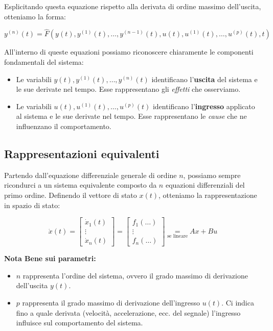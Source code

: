 \documentclass[a4paper,12pt]{article}
\begin{document}
	Esplicitando questa equazione rispetto alla derivata di ordine massimo dell'uscita, otteniamo la forma:
	
	\[
	y^{(n)}(t) = \hat{F}(y(t), y^{(1)}(t), \dots, y^{(n-1)}(t), u(t), u^{(1)}(t), \dots, u^{(p)}(t), t)
	\]
	
	All'interno di queste equazioni possiamo riconoscere chiaramente le componenti fondamentali del sistema:
	\begin{itemize}
		\item Le variabili $y(t), y^{(1)}(t), \dots, y^{(n)}(t)$ identificano l'\textbf{uscita} del sistema e le sue derivate nel tempo. Esse rappresentano gli \textit{effetti} che osserviamo.
		\item Le variabili $u(t), u^{(1)}(t), \dots, u^{(p)}(t)$ identificano l'\textbf{ingresso} applicato al sistema e le sue derivate nel tempo. Esse rappresentano le \textit{cause} che ne influenzano il comportamento.
	\end{itemize}
	\subsection{Rappresentazioni equivalenti}
	
	Partendo dall'equazione differenziale generale di ordine $n$, possiamo sempre ricondurci a un sistema equivalente composto da $n$ equazioni differenziali del primo ordine. Definendo il vettore di stato $x(t)$, otteniamo la rappresentazione in spazio di stato:
	
	\[
	\dot{x}(t) = 
	\begin{bmatrix} 
		\dot{x}_1(t) \\ 
		\vdots \\ 
		\dot{x}_n(t) 
	\end{bmatrix} 
	= 
	\begin{bmatrix} 
		f_1(\dots) \\ 
		\vdots \\ 
		f_n(\dots) 
	\end{bmatrix} 
	\underset{\text{se lineare}}{=} Ax + Bu
	\]
	
	\textbf{Nota Bene sui parametri:}
	\begin{itemize}
		\item $n$ rappresenta l'ordine del sistema, ovvero il grado massimo di derivazione dell'uscita $y(t)$.
		\item $p$ rappresenta il grado massimo di derivazione dell'ingresso $u(t)$. Ci indica fino a quale derivata (velocità, accelerazione, ecc. del segnale) l'ingresso influisce sul comportamento del sistema.
	\end{itemize}
	
\end{document}

